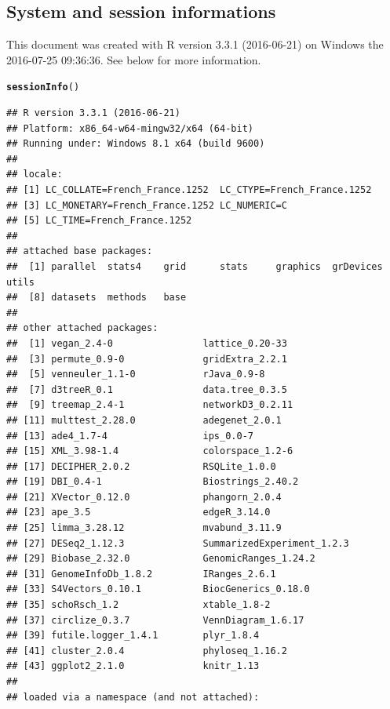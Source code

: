 \documentclass[12pt]{article}\usepackage[]{graphicx}\usepackage[]{color}
\makeatletter
\newcommand{\hlstd}[1]{\textcolor[rgb]{0.345,0.345,0.345}{#1}}%
\newcommand{\hlkwd}[1]{\textcolor[rgb]{0.737,0.353,0.396}{\textbf{#1}}}%
\newenvironment{kframe}{%
 \def\at@end@of@kframe{}%
 \ifinner\ifhmode%
  \def\at@end@of@kframe{\end{minipage}}%
  \begin{minipage}{\columnwidth}%
 \fi\fi%
 \def\FrameCommand##1{\hskip\@totalleftmargin \hskip-\fboxsep
 \colorbox{shadecolor}{##1}\hskip-\fboxsep
     \hskip-\linewidth \hskip-\@totalleftmargin \hskip\columnwidth}%
 \MakeFramed {\advance\hsize-\width
   \@totalleftmargin\z@ \linewidth\hsize
   \@setminipage}}%
 {\par\unskip\endMakeFramed%
 \at@end@of@kframe}
\newenvironment{knitrout}{}{} %
\numberwithin{figure}{section}
\makeatother
\begin{document}
  \subsection{System and session informations}
  This document was created with R version 3.3.1 (2016-06-21) on Windows the 2016-07-25 09:36:36. See below for more information. 
\begin{knitrout}\small
{}\color{fgcolor}\begin{kframe}
\begin{alltt}
\hlkwd{sessionInfo}\hlstd{()}
\end{alltt}
\begin{verbatim}
## R version 3.3.1 (2016-06-21)
## Platform: x86_64-w64-mingw32/x64 (64-bit)
## Running under: Windows 8.1 x64 (build 9600)
## 
## locale:
## [1] LC_COLLATE=French_France.1252  LC_CTYPE=French_France.1252   
## [3] LC_MONETARY=French_France.1252 LC_NUMERIC=C                  
## [5] LC_TIME=French_France.1252    
## 
## attached base packages:
##  [1] parallel  stats4    grid      stats     graphics  grDevices utils    
##  [8] datasets  methods   base     
## 
## other attached packages:
##  [1] vegan_2.4-0                lattice_0.20-33           
##  [3] permute_0.9-0              gridExtra_2.2.1           
##  [5] venneuler_1.1-0            rJava_0.9-8               
##  [7] d3treeR_0.1                data.tree_0.3.5           
##  [9] treemap_2.4-1              networkD3_0.2.11          
## [11] multtest_2.28.0            adegenet_2.0.1            
## [13] ade4_1.7-4                 ips_0.0-7                 
## [15] XML_3.98-1.4               colorspace_1.2-6          
## [17] DECIPHER_2.0.2             RSQLite_1.0.0             
## [19] DBI_0.4-1                  Biostrings_2.40.2         
## [21] XVector_0.12.0             phangorn_2.0.4            
## [23] ape_3.5                    edgeR_3.14.0              
## [25] limma_3.28.12              mvabund_3.11.9            
## [27] DESeq2_1.12.3              SummarizedExperiment_1.2.3
## [29] Biobase_2.32.0             GenomicRanges_1.24.2      
## [31] GenomeInfoDb_1.8.2         IRanges_2.6.1             
## [33] S4Vectors_0.10.1           BiocGenerics_0.18.0       
## [35] schoRsch_1.2               xtable_1.8-2              
## [37] circlize_0.3.7             VennDiagram_1.6.17        
## [39] futile.logger_1.4.1        plyr_1.8.4                
## [41] cluster_2.0.4              phyloseq_1.16.2           
## [43] ggplot2_2.1.0              knitr_1.13                
## 
## loaded via a namespace (and not attached):

\end{verbatim}
\end{kframe}
\end{knitrout}
\end{document}
